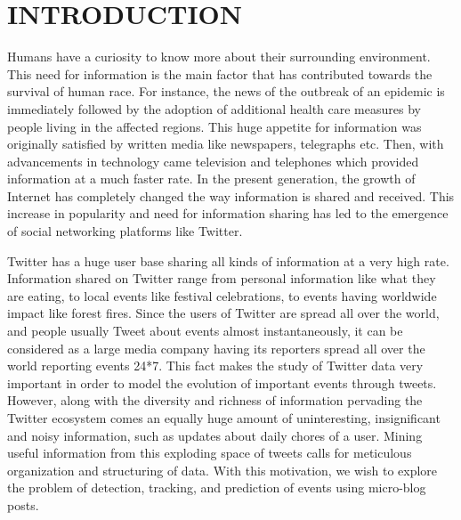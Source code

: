 \section{\uppercase{Introduction}}
Humans have a curiosity to know more about their surrounding environment. This need for information is the main factor that has contributed towards the survival of human race. For instance, the news of the outbreak of an epidemic is immediately followed by the adoption of additional health care measures by people living in the affected regions. This huge appetite for information was originally satisfied by written media like newspapers, telegraphs etc. Then, with advancements in technology came television and telephones which provided information at a much faster rate. In the present generation, the growth of Internet has completely changed the way information is shared and received. This increase in popularity and need for information sharing has led to the emergence of social networking platforms like Twitter.

Twitter has a huge user base sharing all kinds of information at a very high rate. Information shared on Twitter range from personal information like what they are eating, to local events like festival celebrations, to events having worldwide impact like forest fires. Since the users of Twitter are spread all over the world, and people usually Tweet about events almost instantaneously, it can be considered as a large media company having its reporters spread all over the world reporting events 24*7. This fact makes the study of Twitter data very important in order to model the evolution of important events through tweets. However, along with the diversity and richness of information pervading the Twitter ecosystem comes an equally huge amount of uninteresting, insignificant and noisy information, such as updates about daily chores of a user. Mining useful information from this exploding space of tweets calls for meticulous organization and structuring of data. With this motivation, we wish to explore the problem of detection, tracking, and prediction of events using micro-blog posts.